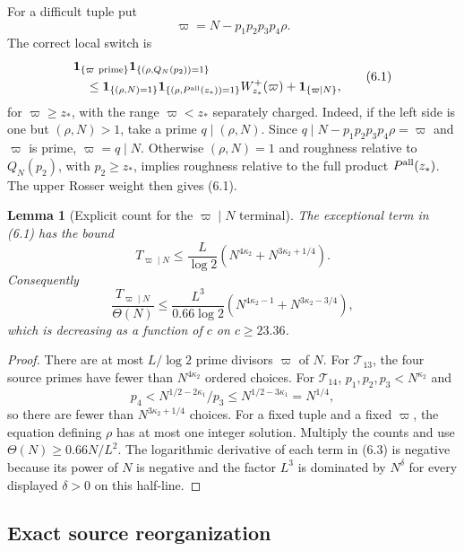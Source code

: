 \documentclass[11pt]{article}
\newtheorem{lemma}[theorem]{Lemma}
\theoremstyle{definition}
\begin{document}
For a difficult tuple put
\[
 \varpi=N-p_1p_2p_3p_4\rho.
\]
The correct local switch is
\[
\begin{aligned}
 &\mathbf1_{\{\varpi\ {\rm prime}\}}
 \mathbf1_{\{(\rho,Q_N(p_2))=1\}}\\
 &\quad\le
 \mathbf1_{\{(\rho,N)=1\}}
 \mathbf1_{\{(\rho,P^{\rm all}(z_*))=1\}}
 W^+_{z_*}(\varpi)
 +\mathbf1_{\{\varpi\mid N\}},
\end{aligned}
\tag{6.1}
\]
for \(\varpi\ge z_*\), with the range \(\varpi<z_*\) separately charged.
Indeed, if the left side is one but \((\rho,N)>1\), take a prime
\(q\mid(\rho,N)\).  Since \(q\mid N-p_1p_2p_3p_4\rho=\varpi\) and
\(\varpi\) is prime, \(\varpi=q\mid N\).  Otherwise
\((\rho,N)=1\) and roughness relative to \(Q_N(p_2)\), with \(p_2\ge z_*\),
implies roughness relative to the full product \(P^{\rm all}(z_*)\).
The upper Rosser weight then gives (6.1).

\begin{lemma}[Explicit count for the \(\varpi\mid N\) terminal]
\label{lem:varpi-N}
The exceptional term in (6.1) has the bound
\[
 T_{\varpi\mid N}\le
 \frac L{\log2}
 \left(N^{4\kappa_2}+N^{3\kappa_2+1/4}\right).
\tag{6.2}
\]
Consequently
\[
 \frac{T_{\varpi\mid N}}{\Theta(N)}
 \le \frac{L^3}{0.66\log2}
 \left(N^{4\kappa_2-1}+N^{3\kappa_2-3/4}\right),
\tag{6.3}
\]
which is decreasing as a function of \(c\) on \(c\ge23.36\).
\end{lemma}

\begin{proof}
There are at most \(L/\log2\) prime divisors \(\varpi\) of \(N\).
For \(\mathscr T_{13}\), the four source primes have fewer than
\(N^{4\kappa_2}\) ordered choices.  For \(\mathscr T_{14}\),
\(p_1,p_2,p_3<N^{\kappa_2}\) and
\[
 p_4<N^{1/2-2\kappa_1}/p_3\le N^{1/2-3\kappa_1}=N^{1/4},
\]
so there are fewer than \(N^{3\kappa_2+1/4}\) choices.  For a fixed tuple
and a fixed \(\varpi\), the equation defining \(\rho\) has at most one
integer solution.  Multiply the counts and use
\(\Theta(N)\ge0.66N/L^2\).  The logarithmic derivative of each term in
(6.3) is negative because its power of \(N\) is negative and the factor
\(L^3\) is dominated by \(N^\delta\) for every displayed
\(\delta>0\) on this half-line.
\end{proof}

\subsection{Exact source reorganization}
\label{sec:source-reorganization}
\end{document}

